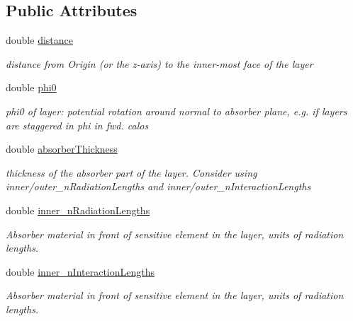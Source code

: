 \subsection*{Public Attributes}
\begin{DoxyCompactItemize}
\item 
double \hyperlink{struct_d_d4hep_1_1_d_d_rec_1_1_layered_calorimeter_struct_1_1_layer_a27ab51429cf061a2b184dc248402a10f}{distance}
\begin{DoxyCompactList}\small\item\em distance from Origin (or the z-\/axis) to the inner-\/most face of the layer \end{DoxyCompactList}\item 
double \hyperlink{struct_d_d4hep_1_1_d_d_rec_1_1_layered_calorimeter_struct_1_1_layer_aab79660830a8d520db2439c5a817f709}{phi0}
\begin{DoxyCompactList}\small\item\em phi0 of layer\+: potential rotation around normal to absorber plane, e.\+g. if layers are \textquotesingle{}staggered\textquotesingle{} in phi in fwd. calos \end{DoxyCompactList}\item 
double \hyperlink{struct_d_d4hep_1_1_d_d_rec_1_1_layered_calorimeter_struct_1_1_layer_ad774498891dc9332c4edb5af822edca0}{absorber\+Thickness}
\begin{DoxyCompactList}\small\item\em thickness of the absorber part of the layer. Consider using inner/outer\+\_\+n\+Radiation\+Lengths and inner/outer\+\_\+n\+Interaction\+Lengths \end{DoxyCompactList}\item 
double \hyperlink{struct_d_d4hep_1_1_d_d_rec_1_1_layered_calorimeter_struct_1_1_layer_aeb711a3f909969fd48ea8e3f6b67473b}{inner\+\_\+n\+Radiation\+Lengths}
\begin{DoxyCompactList}\small\item\em Absorber material in front of sensitive element in the layer, units of radiation lengths. \end{DoxyCompactList}\item 
double \hyperlink{struct_d_d4hep_1_1_d_d_rec_1_1_layered_calorimeter_struct_1_1_layer_a096850bcaa7ae3e30b2c135cdcfc4502}{inner\+\_\+n\+Interaction\+Lengths}
\begin{DoxyCompactList}\small\item\em Absorber material in front of sensitive element in the layer, units of radiation lengths. \end{DoxyCompactList}\item 

\end{DoxyCompactItemize}

